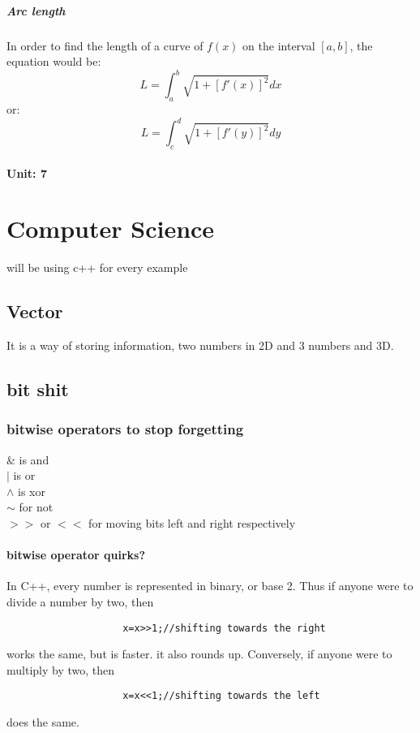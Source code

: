 \documentclass{article} %
\theoremstyle{theorem}
\theoremstyle{definition}
\begin{document}
                \subparagraph{Arc length}
                \label{subp:Arc-length}
                    In order to find the length of a curve of $f(x)$ on the interval $[a,b]$, the equation would be:
                    \begin{equation}
                        \label{eq:arcLengthdx}
                        L=\int_a^b\sqrt{1+[f'(x)]^2}dx
                    \end{equation}
                    or:
                    \begin{equation}
                        \label{eq:arcLengthdy}
                        L=\int_c^d\sqrt{1+[f'(y)]^2}dy
                    \end{equation}
            \pagebreak
            \paragraph{Unit: 7}
            \label{par:Unit-7}%
\pagebreak
\section{Computer Science}\label{sec:csSec}
will be using c++ for every example
    \subsection{Vector}\label{sub:csVec}
    It is a way of storing information, two numbers in 2D and 3 numbers and 3D.
    \subsection{bit shit}
        \subsubsection{bitwise operators to stop forgetting}
            \begin{center}
                \& is and\\$|$ is or\\$\wedge$ is xor\\$\sim$ for not\\$>>$ or $<<$ for moving bits left and right respectively
            \end{center}
            \paragraph{bitwise operator quirks?}
                In C++, every number is represented in binary, or base 2. Thus if anyone were to divide a number by two, then
                \begin{verbatim}
                    x=x>>1;//shifting towards the right
                \end{verbatim}
                works the same, but is faster. it also rounds up. Conversely, if anyone were to multiply by two, then 
                \begin{verbatim}
                    x=x<<1;//shifting towards the left
                \end{verbatim}
                does the same.
\end{document}
